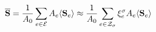 \documentclass[preview]{standalone}
\begin{document}
\begin{align*}
\special{dvisvgm:raw <g id='unique000'>}\overline{\mathbf S} \special{dvisvgm:raw </g>}\special{dvisvgm:raw <g id='unique001'>}=\frac{1}{A_0}\sum_{e\in\mathcal E}A_e\langle\mathbf S_e\rangle \special{dvisvgm:raw </g>}\special{dvisvgm:raw <g id='unique002'>}\approx\frac{1}{A_0}\sum_{e\in\mathcal Z_{\sigma}}\xi_e^{\sigma}A_e\langle\mathbf S_e\rangle\special{dvisvgm:raw </g>}
\end{align*}
\end{document}

